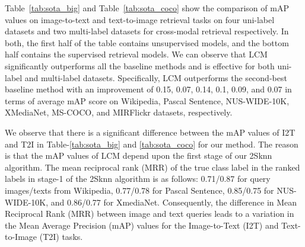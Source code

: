 \par Table~\ref{tab:sota_big} and Table~\ref{tab:sota_coco} show the comparison of mAP values on image-to-text and text-to-image retrieval tasks on four uni-label datasets and two multi-label datasets for cross-modal retrieval respectively. In both, the first half of the table contains unsupervised models, and the bottom half contains the supervised retrieval models. 
We can observe that LCM significantly outperforms all the baseline methods and is effective for both uni-label and multi-label datasets. Specifically, LCM outperforms the second-best baseline method with an improvement of 0.15, 0.07, 0.14, 0.1, 0.09, and 0.07 in terms of average mAP score on Wikipedia, Pascal Sentence, NUS-WIDE-10K, XMediaNet, MS-COCO, and MIRFlickr datasets, respectively.
\par We observe that there is a significant difference between the mAP values of I2T and T2I in Table-\ref{tab:sota_big} and \ref{tab:sota_coco} for our method. The reason is that the mAP values of LCM depend upon the first stage of our 2Sknn algorithm. The mean reciprocal rank (MRR) of the true class label in the ranked labels in stage-1 of the 2Sknn algorithm is as follows: 0.71/0.87 for query images/texts from Wikipedia, 0.77/0.78 for Pascal Sentence, 0.85/0.75 for NUS-WIDE-10K, and 0.86/0.77 for XmediaNet. Consequently, the difference in Mean Reciprocal Rank (MRR) between image and text queries leads to a variation in the Mean Average Precision (mAP) values for the Image-to-Text (I2T) and Text-to-Image (T2I) tasks. 

